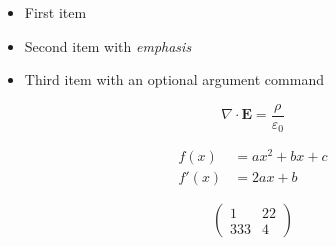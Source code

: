 \begin{itemize}
  \item First item
  \item Second item with \textit{emphasis}
  \item Third item with an optional argument command 
\end{itemize}

\begin{equation}
  \nabla \cdot \mathbf{E} = \frac{\rho}{\varepsilon_0}
\end{equation}

\begin{align}
  f(x) &= a x^2 + b x + c \\
  f'(x) &= 2 a x + b
\end{align}

\[
  \begin{pmatrix}
    1 & 22 \\
    333 & 4
  \end{pmatrix}
\]
